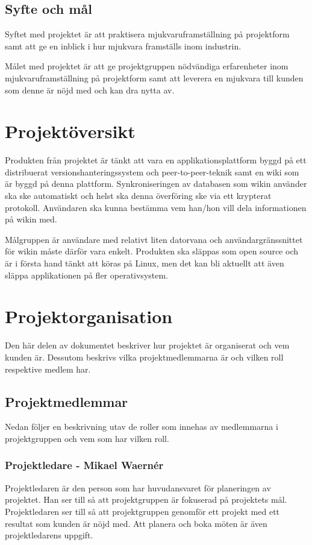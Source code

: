 \subsection{Syfte och mål}
Syftet med projektet är att praktisera mjukvaruframställning på projektform samt att ge en inblick i hur mjukvara framställs inom industrin.

Målet med projektet är att ge projektgruppen nödvändiga erfarenheter inom mjukvaruframställning på projektform samt att leverera en mjukvara till kunden som denne är nöjd med och kan dra nytta av.

\section{Projektöversikt}
Produkten från projektet är tänkt att vara en applikationsplattform byggd på ett distribuerat versionshanteringssystem och peer-to-peer-teknik samt en wiki som är byggd på denna plattform. Synkroniseringen av databasen som wikin använder ska ske automatiskt och helst ska denna överföring ske via ett krypterat protokoll. Användaren ska kunna bestämma vem han/hon vill dela informationen på wikin med.

Målgruppen är användare med relativt liten datorvana och användargränssnittet för wikin måste därför vara enkelt. Produkten ska släppas som open source och är i första hand tänkt att köras på Linux, men det kan bli aktuellt att även släppa applikationen på fler operativsystem.

\section{Projektorganisation}
Den här delen av dokumentet beskriver hur projektet är organiserat och vem kunden är. Dessutom beskrivs vilka projektmedlemmarna är och vilken roll respektive medlem har.

\subsection{Projektmedlemmar}
Nedan följer en beskrivning utav de roller som innehas av medlemmarna i projektgruppen och vem som har vilken roll.

\subsubsection*{Projektledare - Mikael Waernér}
Projektledaren är den person som har huvudansvaret för planeringen av projektet. Han ser till så att projektgruppen är fokuserad på projektets mål. Projektledaren ser till så att projektgruppen genomför ett projekt med ett resultat som kunden är nöjd med. Att planera och boka möten är även projektledarens uppgift.

